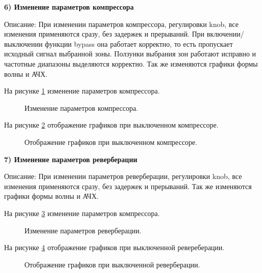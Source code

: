 \textbf{6) Изменение параметров компрессора}

Описание: При изменении параметров компрессора, регулировки knob, все изменения применяются сразу, без задержек и прерываний. При включении/выключении функции bypass она работает корректно, то есть пропускает исходный сигнал выбранной зоны. Ползунки выбрания зон работают исправно и частотные диапазоны выделяются корректно. Так же изменяются графики формы волны и АЧХ.

На рисунке \ref{CompParam:image} изменение параметров компрессора.

\begin{figure}[ht]
	\caption{Изменение параметров компрессора.}
	\label{CompParam:image}
\end{figure}

На рисунке \ref{CompParamOff:image} отображение графиков при выключенном компрессоре.

\begin{figure}[ht]
	\caption{Отображение графиков при выключенном компрессоре.}
	\label{CompParamOff:image}
\end{figure}
\clearpage

\textbf{7) Изменение параметров реверберации}

Описание: При изменении параметров реверберации, регулировки knob, все изменения применяются сразу, без задержек и прерываний. Так же изменяются графики формы волны и АЧХ.

На рисунке \ref{ReverbParam:image} изменение параметров компрессора.

\begin{figure}[ht]
	\caption{Изменение параметров реверберации.}
	\label{ReverbParam:image}
\end{figure}

На рисунке \ref{ReverbParamOff:image} отображение графиков при выключенной ревереберации.

\begin{figure}[ht]
	\caption{Отображение графиков при выключенной реверберации.}
	\label{ReverbParamOff:image}
\end{figure}
\clearpage

